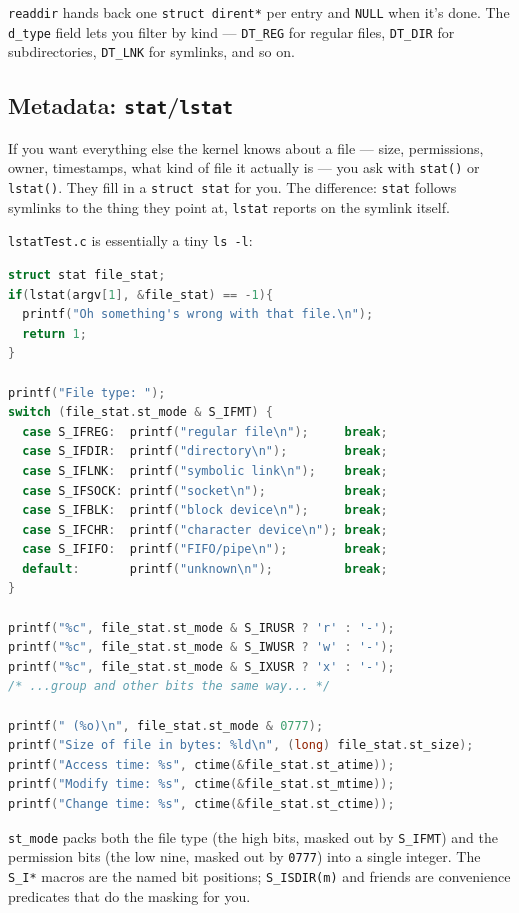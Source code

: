 \documentclass[11pt]{article}
\begin{document}
\texttt{readdir} hands back one \texttt{struct dirent*} per entry and
\texttt{NULL} when it's done. The \texttt{d\_type} field lets you
filter by kind --- \texttt{DT\_REG} for regular files, \texttt{DT\_DIR}
for subdirectories, \texttt{DT\_LNK} for symlinks, and so on.

\subsection*{Metadata: \texttt{stat}/\texttt{lstat}}

If you want everything else the kernel knows about a file --- size,
permissions, owner, timestamps, what kind of file it actually is ---
you ask with \texttt{stat()} or \texttt{lstat()}. They fill in a
\texttt{struct stat} for you. The difference: \texttt{stat} follows
symlinks to the thing they point at, \texttt{lstat} reports on the
symlink itself.

\texttt{lstatTest.c} is essentially a tiny \texttt{ls -l}:

\begin{lstlisting}[language=C]
struct stat file_stat;
if(lstat(argv[1], &file_stat) == -1){
  printf("Oh something's wrong with that file.\n");
  return 1;
}

printf("File type: ");
switch (file_stat.st_mode & S_IFMT) {
  case S_IFREG:  printf("regular file\n");     break;
  case S_IFDIR:  printf("directory\n");        break;
  case S_IFLNK:  printf("symbolic link\n");    break;
  case S_IFSOCK: printf("socket\n");           break;
  case S_IFBLK:  printf("block device\n");     break;
  case S_IFCHR:  printf("character device\n"); break;
  case S_IFIFO:  printf("FIFO/pipe\n");        break;
  default:       printf("unknown\n");          break;
}

printf("%c", file_stat.st_mode & S_IRUSR ? 'r' : '-');
printf("%c", file_stat.st_mode & S_IWUSR ? 'w' : '-');
printf("%c", file_stat.st_mode & S_IXUSR ? 'x' : '-');
/* ...group and other bits the same way... */

printf(" (%o)\n", file_stat.st_mode & 0777);
printf("Size of file in bytes: %ld\n", (long) file_stat.st_size);
printf("Access time: %s", ctime(&file_stat.st_atime));
printf("Modify time: %s", ctime(&file_stat.st_mtime));
printf("Change time: %s", ctime(&file_stat.st_ctime));
\end{lstlisting}

\texttt{st\_mode} packs both the file type (the high bits, masked
out by \texttt{S\_IFMT}) and the permission bits (the low nine,
masked out by \texttt{0777}) into a single integer. The \texttt{S\_I*}
macros are the named bit positions; \texttt{S\_ISDIR(m)} and friends
are convenience predicates that do the masking for you.
\end{document}
